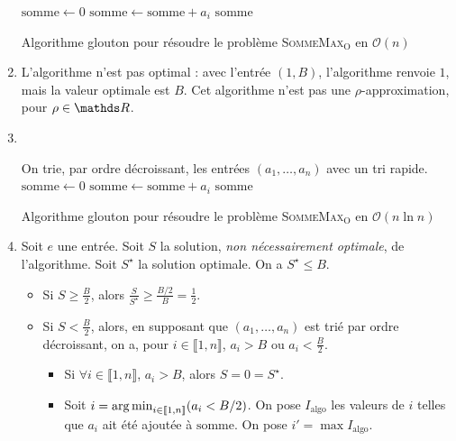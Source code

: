 \begin{enumerate}
\begin{algorithm}[H]
\begin{algorithmic}[1]
				\State $\mathrm{somme} \gets 0$\/
				\State $\mathrm{somme} \gets \mathrm{somme} + a_i$\/
				\EndIf
				\EndFor
				\State\Return $\mathrm{somme}$\/
			\end{algorithmic}
			\caption{Algorithme glouton pour résoudre le problème \textsc{SommeMax}$_\mathrm{O}$ en $\mathcal{O}(n)$\/}
		\end{algorithm}
	\item L'algorithme n'est pas optimal : avec l'entrée $(1, B)$, l'algorithme renvoie $1$, mais la valeur optimale est $B$.
		Cet algorithme n'est pas une $\rho$-approximation, pour $\rho \in \R$.
	\item~\\[-1.5\baselineskip]
		\begin{algorithm}[H]
			\centering
			\begin{algorithmic}[1]
				\State On trie, par ordre décroissant, les entrées $(a_1, \ldots, a_n)$\/ avec un tri rapide.
				\State $\mathrm{somme} \gets 0$\/
				\State $\mathrm{somme} \gets \mathrm{somme} + a_i$\/
				\EndIf
				\EndFor
				\State\Return $\mathrm{somme}$\/
			\end{algorithmic}
			\caption{Algorithme glouton pour résoudre le problème \textsc{SommeMax}$_\mathrm{O}$ en $\mathcal{O}(n \ln n)$\/}
		\end{algorithm}
	\item Soit $e$\/ une entrée.
		Soit $S$\/ la solution, \textit{non nécessairement optimale}, de l'algorithme.
		Soit $S^\star $\/ la solution optimale. On a $S^\star \le B$.
		\begin{itemize}
			\item Si $S \ge \frac{B}{2}$, alors $\frac{S}{S^\star} \ge \frac{B / 2}{B} = \frac{1}{2}$.
			\item Si $S < \frac{B}{2}$, alors, en supposant que $(a_1,\ldots,a_n)$\/ est trié par ordre décroissant, on a, pour $i \in \llbracket 1,n \rrbracket$, $a_i > B$\/ ou $a_i < \frac{B}{2}$.
				\begin{itemize}
					\item Si $\forall i \in \llbracket 1,n \rrbracket$, $a_i > B$, alors  $S = 0 = S^\star$.
					\item Soit $i = \operatorname*{arg\,min}_{i \in \llbracket 1,n \rrbracket} (a_i < B / 2)$.
						On pose $I_\mathrm{algo}$\/ les valeurs de $i$\/ telles que $a_i$\/ ait été ajoutée à $\mathrm{somme}$.
						On pose $i' = \max I_\mathrm{algo}$.


\end{itemize}
\end{itemize}
\end{enumerate}
